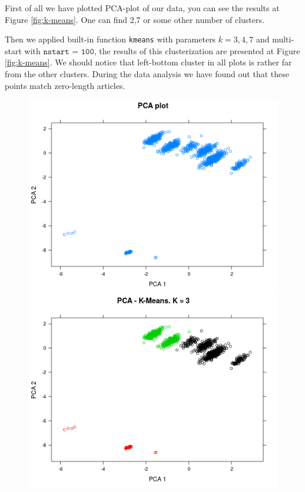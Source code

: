 First of all we have plotted PCA-plot of our data, you can see the results at Figure \ref{fig:k-means}. One can find 2,7 or some other number of clusters. 

Then we applied built-in function \texttt{kmeans} with parameters $k=3,4,7$ and multi-start with $\texttt{nstart = 100}$, the results of this clusterization are presented at Figure \ref{fig:k-means}.
We should notice that left-bottom cluster in all plots is rather far from the other clusters. During the data analysis we have found out that these points match zero-length articles.  

\begin{figure}[h]
	\centering
	\begin{minipage}[h]{0.49\linewidth}
\includegraphics[width=\linewidth]{images/pcaplot_km}
	\end{minipage}
	\hfill
	\begin{minipage}[h]{0.49\linewidth}
\includegraphics[width=\linewidth]{images/kmean3}

\end{minipage}
\end{figure}
